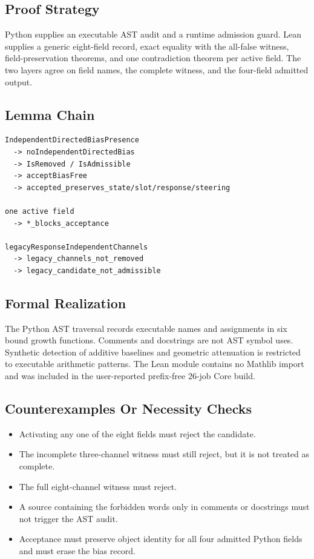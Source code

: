 \subsection{Proof Strategy}\label{proof-strategy-7}

Python supplies an executable AST audit and a runtime admission guard.
Lean supplies a generic eight-field record, exact equality with the
all-false witness, field-preservation theorems, and one contradiction
theorem per active field. The two layers agree on field names, the
complete witness, and the four-field admitted output.

\subsection{Lemma Chain}\label{lemma-chain-7}

\begin{verbatim}
IndependentDirectedBiasPresence
  -> noIndependentDirectedBias
  -> IsRemoved / IsAdmissible
  -> acceptBiasFree
  -> accepted_preserves_state/slot/response/steering

one active field
  -> *_blocks_acceptance

legacyResponseIndependentChannels
  -> legacy_channels_not_removed
  -> legacy_candidate_not_admissible
\end{verbatim}

\subsection{Formal Realization}\label{formal-realization-7}

The Python AST traversal records executable names and assignments in six
bound growth functions. Comments and docstrings are not AST symbol uses.
Synthetic detection of additive baselines and geometric attenuation is
restricted to executable arithmetic patterns. The Lean module contains
no Mathlib import and was included in the user-reported prefix-free
26-job Core build.

\subsection{Counterexamples Or Necessity
Checks}\label{counterexamples-or-necessity-checks-7}

\begin{itemize}
\tightlist
\item
  Activating any one of the eight fields must reject the candidate.
\item
  The incomplete three-channel witness must still reject, but it is not
  treated as complete.
\item
  The full eight-channel witness must reject.
\item
  A source containing the forbidden words only in comments or docstrings
  must not trigger the AST audit.
\item
  Acceptance must preserve object identity for all four admitted Python
  fields and must erase the bias record.
\end{itemize}

